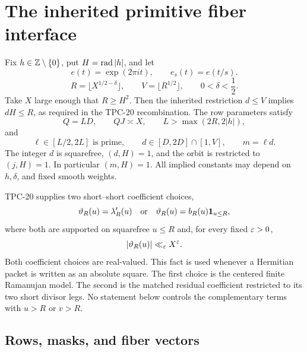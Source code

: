 \section{The inherited primitive fiber interface}
\label{sec:tpc21-interface}

Fix \(h\in\mathbb Z\setminus\{0\}\), put \(H=\operatorname{rad}|h|\), and let
\[
 e(t)=\exp(2\pi i t),\qquad e_s(t)=e(t/s).
\]
\begin{equation}
 R=\lfloor X^{1/2-\delta}\rfloor,
 \qquad
 V=\lfloor R^{1/2}\rfloor,
 \qquad 0<\delta<\frac12.
 \label{eq:tpc21-RV}
\end{equation}
Take \(X\) large enough that \(R\ge H^2\).  Then the inherited
restriction \(d\le V\) implies \(dH\le R\), as required in the TPC-20
recombination.
The row parameters satisfy
\begin{equation}
 Q=LD,\qquad QJ\asymp X,\qquad
 L>\max(2R,2|h|),
 \label{eq:tpc21-row-scales}
\end{equation}
and
\begin{equation}
 \ell\in[L/2,2L]\text{ is prime},
 \qquad
 d\in[D,2D]\cap[1,V],
 \qquad
 m=\ell d.
 \label{eq:tpc21-row-support}
\end{equation}
The integer \(d\) is squarefree, \((d,H)=1\), and the orbit is restricted
to \((j,H)=1\).  In particular \((m,H)=1\).  All implied constants may
depend on \(h,\delta\), and fixed smooth weights.

TPC-20 supplies two short--short coefficient choices,
\begin{equation}
 \vartheta_R(u)=\lambda'_R(u)
 \quad\text{or}\quad
 \vartheta_R(u)=b_R(u)\mathbf 1_{u\le R},
 \label{eq:tpc21-theta-choices}
\end{equation}
where both are supported on squarefree \(u\le R\) and, for every
fixed \(\varepsilon>0\),
\begin{equation}
 |\vartheta_R(u)|\ll_\varepsilon X^\varepsilon.
 \label{eq:tpc21-theta-soft}
\end{equation}
Both coefficient choices are real-valued.  This fact is used whenever
a Hermitian packet is written as an absolute square.
The first choice is the centered finite Ramanujan model.  The second is
the matched residual coefficient restricted to its two short divisor
legs.  No statement below controls the complementary terms with
\(u>R\) or \(v>R\).

\subsection{Rows, masks, and fiber vectors}

